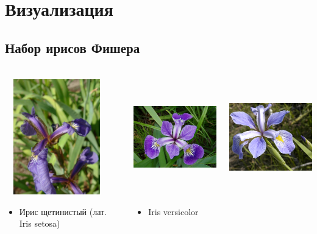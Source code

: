 \documentclass[t,aspectratio=169]{beamer}  %
\begin{document}
\section{Визуализация}
\subsection{Набор ирисов Фишера}

\begin{frame}
	\frametitle{\insertsection} 
	\framesubtitle{\insertsubsection}
	\begin{columns}
		\begin{column}[t]{0.3\linewidth}
			\includegraphics[height=5cm, width=4.5cm]{Iris_setosa.jpg}
			\begin{itemize}
				\item 	Ирис щетинистый (лат. Iris setosa)
			\end{itemize}
		\end{column}	
		\begin{column}[t]{0.3\linewidth}
			\includegraphics[height=5cm, width=4.5cm]{Iris_versicolor.jpg}
			\begin{itemize}
				\item Iris versicolor
			\end{itemize}
		\end{column}
   		\begin{column}[t]{0.3\linewidth}
   			\includegraphics[height=5cm, width=4.5cm]{Iris_virginica.jpg}

\end{column}
\end{columns}
\end{frame}
\end{document}
